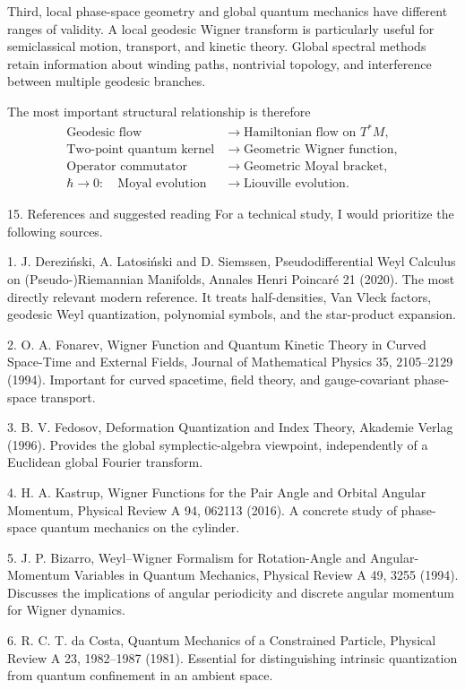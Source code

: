 Third, local phase-space geometry and global quantum mechanics have different ranges of validity. A local geodesic Wigner transform is particularly useful for semiclassical motion, transport, and kinetic theory. Global spectral methods retain information about winding paths, nontrivial topology, and interference between multiple geodesic branches.

The most important structural relationship is therefore
\[
\boxed{
\begin{aligned}
\text{Geodesic flow}
&\longrightarrow
\text{Hamiltonian flow on }T^*M,\\
\text{Two-point quantum kernel}
&\longrightarrow
\text{Geometric Wigner function},\\
\text{Operator commutator}
&\longrightarrow
\text{Geometric Moyal bracket},\\
\hbar\to0:\quad
\text{Moyal evolution}
&\longrightarrow
\text{Liouville evolution}.
\end{aligned}
}
\]

15. References and suggested reading
For a technical study, I would prioritize the following sources.

1. J. Dereziński, A. Latosiński and D. Siemssen, Pseudodifferential Weyl Calculus on (Pseudo-)Riemannian Manifolds, Annales Henri Poincaré 21 (2020). The most directly relevant modern reference. It treats half-densities, Van Vleck factors, geodesic Weyl quantization, polynomial symbols, and the star-product expansion.

2. O. A. Fonarev, Wigner Function and Quantum Kinetic Theory in Curved Space-Time and External Fields, Journal of Mathematical Physics 35, 2105–2129 (1994). Important for curved spacetime, field theory, and gauge-covariant phase-space transport.

3. B. V. Fedosov, Deformation Quantization and Index Theory, Akademie Verlag (1996). Provides the global symplectic-algebra viewpoint, independently of a Euclidean global Fourier transform.

4. H. A. Kastrup, Wigner Functions for the Pair Angle and Orbital Angular Momentum, Physical Review A 94, 062113 (2016). A concrete study of phase-space quantum mechanics on the cylinder.

5. J. P. Bizarro, Weyl–Wigner Formalism for Rotation-Angle and Angular-Momentum Variables in Quantum Mechanics, Physical Review A 49, 3255 (1994). Discusses the implications of angular periodicity and discrete angular momentum for Wigner dynamics.

6. R. C. T. da Costa, Quantum Mechanics of a Constrained Particle, Physical Review A 23, 1982–1987 (1981). Essential for distinguishing intrinsic quantization from quantum confinement in an ambient space.

